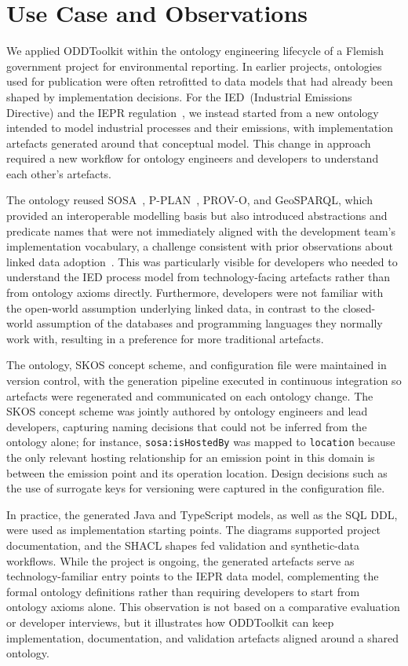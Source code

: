 \section{Use Case and Observations} \label{sec:usecase}
We applied ODDToolkit within the ontology engineering lifecycle of a Flemish government project for environmental reporting. In earlier projects, ontologies used for publication were often retrofitted to data models that had already been shaped by implementation decisions. For the IED~(Industrial Emissions Directive) and the IEPR regulation~\cite{EU2024_1244}, we instead started from a new ontology intended to model industrial processes and their emissions, with implementation artefacts generated around that conceptual model. This change in approach required a new workflow for ontology engineers and developers to understand each other's artefacts.

The ontology reused SOSA~\cite{janowicz2019sosa}, P-PLAN~\cite{garijo2012pplan}, PROV-O, and GeoSPARQL, which provided an interoperable modelling basis but also introduced abstractions and predicate names that were not immediately aligned with the development team's implementation vocabulary, a challenge consistent with prior observations about linked data adoption~\cite{9963753,avila2020applications}. This was particularly visible for developers who needed to understand the IED process model from technology-facing artefacts rather than from ontology axioms directly. Furthermore, developers were not familiar with the open-world assumption underlying linked data, in contrast to the closed-world assumption of the databases and programming languages they normally work with, resulting in a preference for more traditional artefacts.

The ontology, SKOS concept scheme, and configuration file were maintained in version control, with the generation pipeline executed in continuous integration so artefacts were regenerated and communicated on each ontology change. The SKOS concept scheme was jointly authored by ontology engineers and lead developers, capturing naming decisions that could not be inferred from the ontology alone; for instance, \texttt{sosa:isHostedBy} was mapped to \texttt{location} because the only relevant hosting relationship for an emission point in this domain is between the emission point and its operation location. Design decisions such as the use of surrogate keys for versioning were captured in the configuration file.

In practice, the generated Java and TypeScript models, as well as the SQL DDL, were used as implementation starting points. The diagrams supported project documentation, and the SHACL shapes fed validation and synthetic-data workflows. While the project is ongoing, the generated artefacts serve as technology-familiar entry points to the IEPR data model, complementing the formal ontology definitions rather than requiring developers to start from ontology axioms alone. This observation is not based on a comparative evaluation or developer interviews, but it illustrates how ODDToolkit can keep implementation, documentation, and validation artefacts aligned around a shared ontology.
